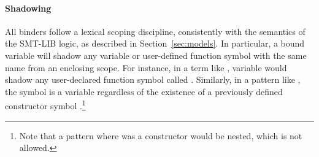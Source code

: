 
\paragraph{Shadowing}
All binders follow a lexical scoping discipline, 
consistently with the semantics of the SMT-LIB logic,
as described in Section~\ref{sec:models}.
In particular, a bound variable will shadow any variable or user-defined 
function symbol with the same name from an enclosing scope.
For instance, in a term like
,
variable  would shadow any user-declared function symbol
called .
Similarly, in a  pattern like ,
the symbol  is a variable regardless of the existence 
of a previously defined constructor symbol .\footnote{%
Note that a pattern  where  was a constructor
would be nested, which is not allowed. 
}

